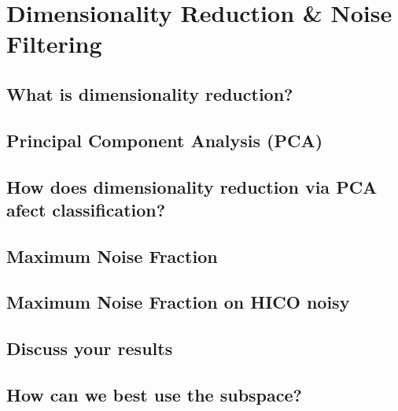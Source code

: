 \section{Dimensionality Reduction \& Noise Filtering}

\subsection{What is dimensionality reduction?}

\subsection{Principal Component Analysis (PCA)}

\subsection{How does dimensionality reduction via PCA afect classification?}

\subsection{Maximum Noise Fraction}

\subsection{Maximum Noise Fraction on HICO noisy}

\subsection{Discuss your results}

\subsection{How can we best use the subspace?}
